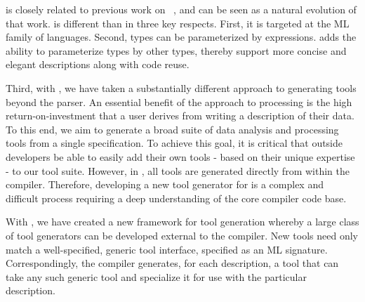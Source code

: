 
\padsml{} is closely related to previous work on
\pads{}~\cite{pads-pldi}, and can be seen as a natural evolution of
that work. \padsml{} is different than \pads{} in three key respects.
First, it is targeted at the ML family of languages. Second, \pads{}
types can be parameterized by expressions. \padsml{} adds the ability
to parameterize types by other types, thereby support more concise and
elegant descriptions along with code reuse.

Third, with \padsml{}, we have taken a substantially different
approach to generating tools beyond the parser. An essential benefit
of the \pads{} approach to processing is the high return-on-investment
that a user derives from writing a description of their data. To this
end, we aim to generate a broad suite of data analysis and processing
tools from a single specification. To achieve this goal, it is
critical that outside developers be able to easily add their own tools
- based on their unique expertise - to our tool suite. However, in
\pads{}, all tools are generated directly from within the compiler.
Therefore, developing a new tool generator for \pads{} is a complex
and difficult process requiring a deep understanding of the core
compiler code base.

With \padsml{}, we have created a new framework for tool generation
whereby a large class of tool generators can be developed external to
the compiler.  New tools need only match a well-specified, generic
tool interface, specified as an ML signature. Correspondingly, the
compiler generates, for each description, a tool that can take any
such generic tool and specialize it for use with the particular
description.

